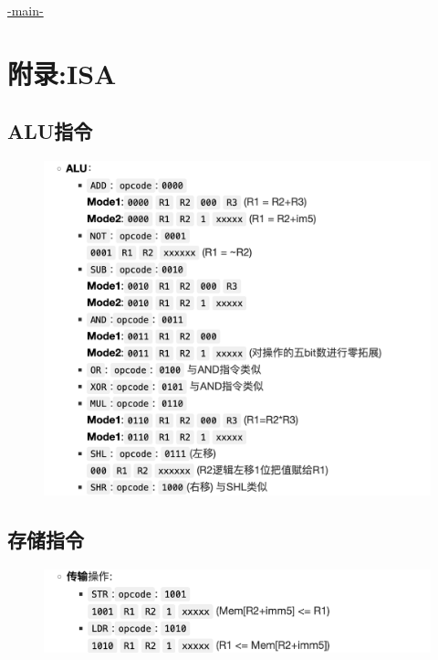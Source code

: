 \documentclass{article}
\begin{document}
\href{https://github.com/lyh031026huahuo1234/FPGA/commit/6cd80229a412af0df88642db99a90405ca530a39}{-main-}

\section{附录:ISA}
\subsection{ALU指令}

\begin{figure}[H]
    \centering
    \includegraphics[width=1\textwidth]{pic/22.png}
   
    \end{figure}
    

\subsection{存储指令}
\begin{figure}[H]
    \centering
    \includegraphics[width=1\textwidth]{pic/23.png}
   
    \end{figure}
\end{document}
